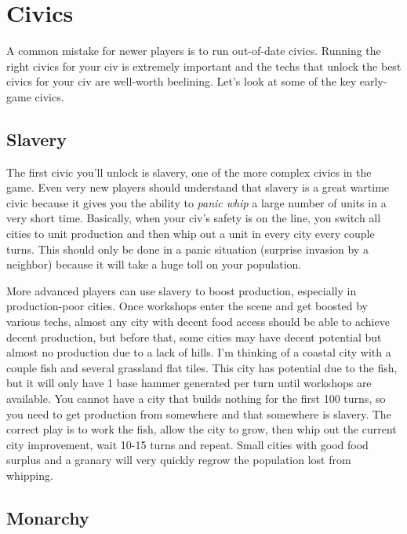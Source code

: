 \documentclass[10pt]{article}
\begin{document}
\section*{Civics}

A common mistake for newer players is to run out-of-date
civics. Running the right civics for your civ is extremely important
and the techs that unlock the best civics for your civ are well-worth
beelining. Let's look at some of the key early-game civics.

\subsection*{Slavery}

The first civic you'll unlock is slavery, one of the more complex
civics in the game. Even very new players should understand that
slavery is a great wartime civic because it gives you the ability to
\emph{panic whip} a large number of units in a very short
time. Basically, when your civ's safety is on the line, you switch all
cities to unit production and then whip out a unit in every city every
couple turns. This should only be done in a panic situation (surprise
invasion by a neighbor) because it will take a huge toll on your
population.

More advanced players can use slavery to boost production, especially
in production-poor cities.  Once workshops enter the scene and get
boosted by various techs, almost any city with decent food access
should be able to achieve decent production, but before that, some
cities may have decent potential but almost no production due to a
lack of hills. I'm thinking of a coastal city with a couple fish and
several grassland flat tiles. This city has potential due to the fish,
but it will only have 1 base hammer generated per turn until workshops
are available. You cannot have a city that builds nothing for the
first 100 turns, so you need to get production from somewhere and that
somewhere is slavery. The correct play is to work the fish, allow the
city to grow, then whip out the current city improvement, wait 10-15
turns and repeat. Small cities with good food surplus and a granary
will very quickly regrow the population lost from whipping.

\subsection*{Monarchy}
\end{document}
